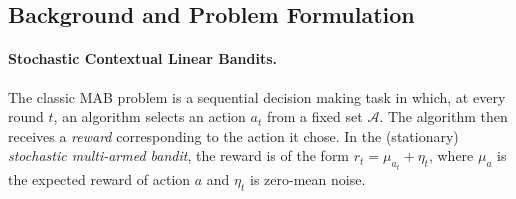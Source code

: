\documentclass{article}
\DeclarePairedDelimiter{\paren}()
\newcommand{\A}{\mathcal{A}}
\begin{document}


\subsection{Background and Problem Formulation}
\label{subsec:intro_background}

\paragraph{Stochastic Contextual Linear Bandits.}
The classic MAB problem is a sequential decision making task in which, at
every round $t$, an algorithm selects an action $a_t$ from a fixed set $\A$.
The algorithm then receives a \emph{reward}
corresponding to the action it chose.  In the (stationary)
\emph{stochastic multi-armed bandit}, the reward is of the form $r_t =
\mu_{a_t} + \eta_t$, where $\mu_a$ is the expected reward of action $a$
and $\eta_t$ is zero-mean noise.
\end{document}
